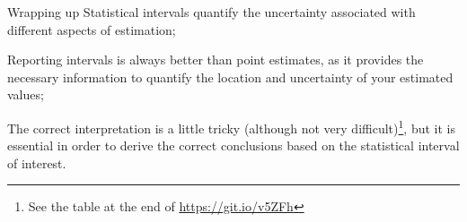 %
%
%
%
%
%


\begin{frame}{Wrapping up}
Statistical intervals quantify the uncertainty associated with different aspects of estimation;
\bigskip

Reporting intervals is always better than point estimates, as it provides the necessary information to quantify the location and uncertainty of your estimated values;
\bigskip

The correct interpretation is a little tricky (although not very difficult)\footnote{See the table at the end of  \url{https://git.io/v5ZFh}}, but it is essential in order to derive the correct conclusions based on the statistical interval of interest.
\end{frame}


